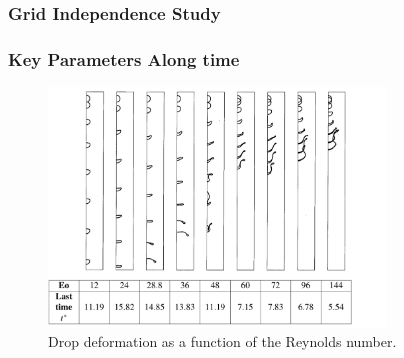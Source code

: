 \documentclass[12pt]{article}
\begin{document}
\subsubsection{Grid Independence Study}

\subsubsection{Key Parameters Along time}

\begin{figure}[H]
    \centering
    \includegraphics[width=0.8\textwidth]{Latex/figures/Trygg_allEo.jpg}
    \caption{Drop deformation as a function of the Reynolds number.}
    \label{deformation}
\end{figure}


\end{document}
